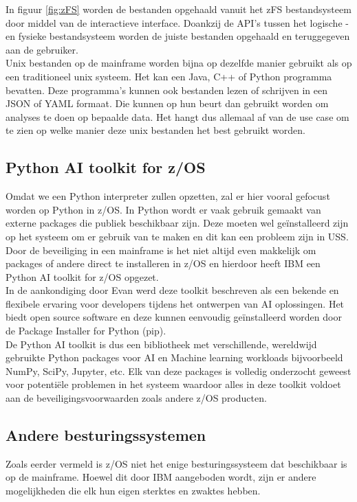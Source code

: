 In figuur \ref{fig:zFS} worden de bestanden opgehaald vanuit het zFS bestandsysteem door middel van de interactieve interface. Doankzij de API's tussen het logische -en fysieke bestandsysteem worden de juiste bestanden opgehaald en teruggegeven aan de gebruiker. \\

Unix bestanden op de mainframe worden bijna op dezelfde manier gebruikt als op een traditioneel unix systeem. Het kan een Java, C++ of Python programma bevatten. Deze programma's kunnen ook bestanden lezen of schrijven in een JSON of YAML formaat. Die kunnen op hun beurt dan gebruikt worden om analyses te doen op bepaalde data. Het hangt dus allemaal af van de use case om te zien op welke manier deze unix bestanden het best gebruikt worden. \autocite{Precisely2020}

\subsection{Python AI toolkit for z/OS}
Omdat we een Python interpreter zullen opzetten, zal er hier vooral gefocust worden op Python in z/OS. In Python wordt er vaak gebruik gemaakt van externe packages die publiek beschikbaar zijn. Deze moeten wel geïnstalleerd zijn op het systeem om er gebruik van te maken en dit kan een probleem zijn in USS. Door de beveiliging in een mainframe is het niet altijd even makkelijk om packages of andere direct te installeren in z/OS \autocite{IBM2021} en hierdoor heeft IBM een Python AI toolkit for z/OS opgezet. \\

In de aankondiging door Evan \textcite{Rivera2023} werd deze toolkit beschreven als een bekende en flexibele ervaring voor developers tijdens het ontwerpen van AI oplossingen. Het biedt open source software en deze kunnen eenvoudig geïnstalleerd worden door de Package Installer for Python (pip). \\

De Python AI toolkit is dus een bibliotheek met verschillende, wereldwijd gebruikte Python packages voor AI en Machine learning workloads bijvoorbeeld NumPy, SciPy, Jupyter, etc. Elk van deze packages is volledig onderzocht geweest voor potentiële problemen in het systeem waardoor alles in deze toolkit voldoet aan de beveiligingsvoorwaarden zoals andere z/OS producten. \autocite{Bostian2023}

\subsection{Andere besturingssystemen}
Zoals eerder vermeld is z/OS niet het enige besturingssysteem dat beschikbaar is op de mainframe. Hoewel dit door IBM aangeboden wordt, zijn er andere mogelijkheden die elk hun eigen sterktes en zwaktes hebben. \\

